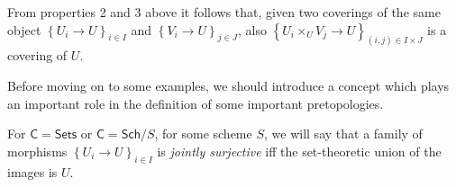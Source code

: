 \begin{rem}[]
	From properties 2 and 3 above it follows that, given 
	two coverings of the same object $\left\{ U_{ i } \to U \right\}_{ i \in I }$
	and $\left\{ V_{ i } \to U \right\}_{ j \in J }$, also
	$\left\{ U_{ i } \times_U V_j \to U \right\}_{ (i,j) \in I \times J }$
	is a covering of $U$.
\end{rem}


\noindent
Before moving on to some examples, we should introduce a
concept which plays an important role in the definition of
some important pretopologies.
\begin{defn}
	For $\mathsf{C} = \mathsf{Sets}$ or $\mathsf{C} = \mathsf{Sch}/S$, for some scheme $S$,
	we will say that a family of morphisms
	$\left\{ U_{ i } \to U \right\}_{ i \in I }$ is \emph{jointly surjective} iff
	the set-theoretic union of the images is $U$.
\end{defn}



